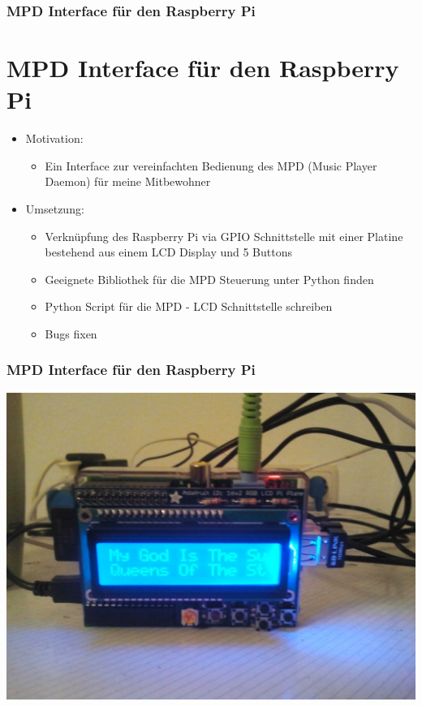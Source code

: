 \documentclass{beamer}
\begin{document}
\begin{frame}
	\frametitle{MPD Interface für den Raspberry Pi}
	\section{MPD Interface für den Raspberry Pi}

	\begin{itemize}
	 \item Motivation:
	  \begin{itemize}
	   \item Ein Interface zur vereinfachten Bedienung des MPD (Music Player Daemon) für meine Mitbewohner
	  \end{itemize}
	 \item Umsetzung:
	  \begin{itemize}
	    \item Verknüpfung des Raspberry Pi via GPIO Schnittstelle mit einer Platine bestehend aus einem LCD Display und 5 Buttons
	    \item Geeignete Bibliothek für die MPD Steuerung unter Python finden
	    \item Python Script für die MPD - LCD Schnittstelle schreiben
	    \item Bugs fixen
	  \end{itemize}
	\end{itemize}
\end{frame}

\begin{frame}
  \frametitle{MPD Interface für den Raspberry Pi}
  \centering
  \includegraphics[bb=0 0 2560 1920,scale=0.1,keepaspectratio=true]{./pic/01.jpg}
\end{frame}
\end{document}
